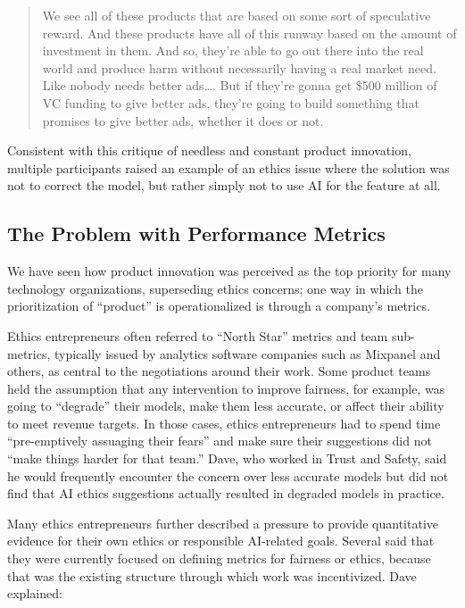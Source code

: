 \documentclass[sigconf]{acmart}
\begin{document}
\begin{quote}
    We see all of these products that are based on some sort of speculative reward. And these products have all of this runway based on the amount of investment in them. And so, they’re able to go out there into the real world and produce harm without necessarily having a real market need. Like nobody needs better ads…. But if they’re gonna get \$500 million of VC funding to give better ads, they’re going to build something that promises to give better ads, whether it does or not.

\end{quote}

Consistent with this critique of needless and constant product innovation, multiple participants raised an example of an ethics issue where the solution was not to correct the model, but rather simply not to use AI for the feature at all. 

\subsection{The Problem with Performance Metrics}

We have seen how product innovation was perceived as the top priority for many technology organizations, superseding ethics concerns; one way in which the prioritization of “product” is operationalized is through a company’s metrics. 

Ethics entrepreneurs often referred to “North Star” metrics and team sub-metrics, typically issued by analytics software companies such as Mixpanel and others, as central to the negotiations around their work. Some product teams held the assumption that any intervention to improve fairness, for example, was going to “degrade” their models, make them less accurate, or affect their ability to meet revenue targets. In those cases, ethics entrepreneurs had to spend time “pre-emptively assuaging their fears” and make sure their suggestions did not “make things harder for that team.” Dave, who worked in Trust and Safety, said he would frequently encounter the concern over less accurate models but did not find that AI ethics suggestions actually resulted in degraded models in practice. 

Many ethics entrepreneurs further described a pressure to provide quantitative evidence for their own ethics or responsible AI-related goals. Several said that they were currently focused on defining metrics for fairness or ethics, because that was the existing structure through which work was incentivized. Dave explained:
\end{document}

